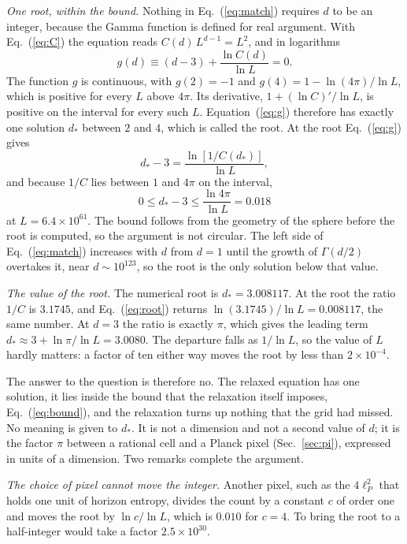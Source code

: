 \documentclass[aps,prd,twocolumn,superscriptaddress,nofootinbib]{revtex4-2}
\begin{document}
\textit{One root, within the bound.} Nothing in Eq.~(\ref{eq:match}) requires $d$ to be an integer, because the Gamma function is defined for real argument. With Eq.~(\ref{eq:C}) the equation reads $C(d)\,L^{d-1} = L^2$, and in logarithms
\begin{equation}
g(d) \equiv (d - 3) + \frac{\ln C(d)}{\ln L} = 0 .
\label{eq:g}
\end{equation}
The function $g$ is continuous, with $g(2) = -1$ and $g(4) = 1 - \ln(4\pi)/\ln L$, which is positive for every $L$ above $4\pi$. Its derivative, $1 + (\ln C)'/\ln L$, is positive on the interval for every such $L$. Equation~(\ref{eq:g}) therefore has exactly one solution $d_*$ between $2$ and $4$, which is called the root. At the root Eq.~(\ref{eq:g}) gives
\begin{equation}
d_* - 3 = \frac{\ln[1/C(d_*)]}{\ln L} ,
\label{eq:root}
\end{equation}
and because $1/C$ lies between $1$ and $4\pi$ on the interval,
\begin{equation}
0 \le d_* - 3 \le \frac{\ln 4\pi}{\ln L} = 0.018
\label{eq:bound}
\end{equation}
at $L = 6.4\times10^{61}$. The bound follows from the geometry of the sphere before the root is computed, so the argument is not circular. The left side of Eq.~(\ref{eq:match}) increases with $d$ from $d = 1$ until the growth of $\Gamma(d/2)$ overtakes it, near $d \sim 10^{123}$, so the root is the only solution below that value.

\textit{The value of the root.} The numerical root is $d_* = 3.008117$. At the root the ratio $1/C$ is $3.1745$, and Eq.~(\ref{eq:root}) returns $\ln(3.1745)/\ln L = 0.008117$, the same number. At $d = 3$ the ratio is exactly $\pi$, which gives the leading term $d_* \approx 3 + \ln\pi/\ln L = 3.0080$. The departure falls as $1/\ln L$, so the value of $L$ hardly matters: a factor of ten either way moves the root by less than $2\times10^{-4}$.

The answer to the question is therefore no. The relaxed equation has one solution, it lies inside the bound that the relaxation itself imposes, Eq.~(\ref{eq:bound}), and the relaxation turns up nothing that the grid had missed. No meaning is given to $d_*$. It is not a dimension and not a second value of $d$; it is the factor $\pi$ between a rational cell and a Planck pixel (Sec.~\ref{sec:pi}), expressed in units of a dimension. Two remarks complete the argument.

\textit{The choice of pixel cannot move the integer.} Another pixel, such as the $4\ell_P^2$ that holds one unit of horizon entropy, divides the count by a constant $c$ of order one and moves the root by $\ln c/\ln L$, which is $0.010$ for $c = 4$. To bring the root to a half-integer would take a factor $2.5\times10^{30}$.
\end{document}
